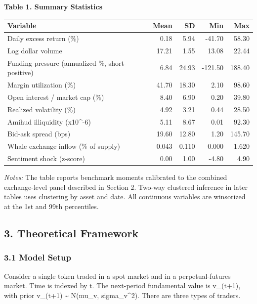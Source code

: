 \documentclass[
]{article}
\newcounter{none} %
\begin{document}
\textbf{Table 1. Summary Statistics}

{\def\LTcaptype{none} %
\begin{longtable}[]{@{}lrrrr@{}}
\toprule\noalign{}
Variable & Mean & SD & Min & Max \\
\midrule\noalign{}
\endhead
\bottomrule\noalign{}
\endlastfoot
Daily excess return (\%) & 0.18 & 5.94 & -41.70 & 58.30 \\
Log dollar volume & 17.21 & 1.55 & 13.08 & 22.44 \\
Funding pressure (annualized \%, short-positive) & 6.84 & 24.93 &
-121.50 & 188.40 \\
Margin utilization (\%) & 41.70 & 18.30 & 2.10 & 98.60 \\
Open interest / market cap (\%) & 8.40 & 6.90 & 0.20 & 39.80 \\
Realized volatility (\%) & 4.92 & 3.21 & 0.44 & 28.50 \\
Amihud illiquidity (x10\^{}-6) & 5.11 & 8.67 & 0.01 & 92.30 \\
Bid-ask spread (bps) & 19.60 & 12.80 & 1.20 & 145.70 \\
Whale exchange inflow (\% of supply) & 0.043 & 0.110 & 0.000 & 1.620 \\
Sentiment shock (z-score) & 0.00 & 1.00 & -4.80 & 4.90 \\
\end{longtable}
}

\emph{Notes:} The table reports benchmark moments calibrated to the
combined exchange-level panel described in Section 2. Two-way clustered
inference in later tables uses clustering by asset and date. All
continuous variables are winsorized at the 1st and 99th percentiles.

\subsection{3. Theoretical Framework}\label{3-theoretical-framework}

\subsubsection{3.1 Model Setup}\label{31-model-setup}

Consider a single token traded in a spot market and in a
perpetual-futures market. Time is indexed by t. The next-period
fundamental value is v\_(t+1), with prior v\_(t+1) \textasciitilde{}
N(mu\_v, sigma\_v\^{}2). There are three types of traders.
\end{document}
